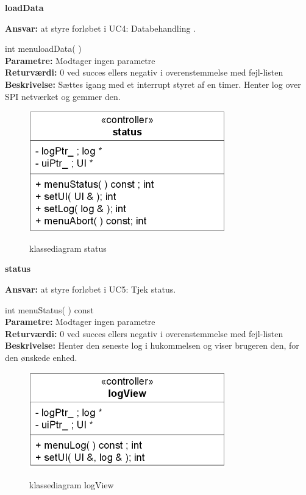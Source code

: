 {\centering
\textbf{loadData}\par
}
\textbf{Ansvar:} at styre forløbet i UC4: Databehandling . \

int menuloadData( ) \\
\textbf{Parametre:} Modtager ingen parametre \\
\textbf{Returværdi:} 0 ved succes ellers negativ i overenstemmelse med fejl-listen \\
\textbf{Beskrivelse:} Sættes igang med et interrupt styret af en timer. Henter log over SPI netværket og gemmer den.\\

\begin{figure}[htbp] \centering
{\includegraphics[scale=1.5]{filer/design/Klassediagrammer/sw_status}}
\caption{klassediagram status}
\label{fig:status klassediagram}
\end{figure} 

\newpage

{\centering
\textbf{status}\par
}
\textbf{Ansvar:} at styre forløbet i UC5: Tjek status. \

int menuStatus( ) const \\
\textbf{Parametre:} Modtager ingen parametre \\
\textbf{Returværdi:} 0 ved succes ellers negativ i overenstemmelse med fejl-listen \\
\textbf{Beskrivelse:} Henter den seneste log i hukommelsen og viser brugeren den, for den ønskede enhed.\\

\begin{figure}[htbp] \centering
{\includegraphics[scale=1.5]{filer/design/Klassediagrammer/sw_logView}}
\caption{klassediagram logView}
\label{fig:logView klassediagram}
\end{figure}

